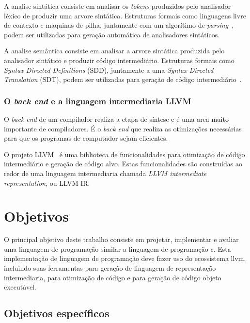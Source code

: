 \documentclass[
  12pt,
  openright,
  twoside,
  a4paper,
  english,
  brazil
]{abntex2}
\begin{document}
A analise sintática consiste em analisar os \textit{tokens} produzidos pelo analisador léxico de produzir uma arvore sintática.
Estruturas formais como linguagens livre de contexto e maquinas de pilha, juntamente com um algorítimo de \textit{parsing}~\cite{knuth1965translation}, podem ser utilizadas para geração automática de analisadores sintáticos.

A analise semântica consiste em analisar a arvore sintática produzida pelo analisador sintático e produzir código intermediário.
Estruturas formais como \textit{Syntax Directed Definitions} (SDD), juntamente a uma \textit{Syntax Directed Translation} (SDT), podem ser utilizadas para geração de código intermediário~\cite{Aho:2006:CPT:1177220}.

\subsection{O \textit{back end} e a linguagem intermediaria LLVM}\label{cap:introducao:sec:o_back_end}

O \textit{back end} de um compilador realiza a etapa de síntese e é uma area muito importante de compiladores.
É o \textit{back end} que realiza as otimizações necessárias para que os programas de computador sejam eficientes.

O projeto LLVM~\cite{lattner2004llvm} é uma biblioteca de funcionalidades para otimização de código intermediário e geração de código alvo.
Estas funcionalidades são construídas ao redor de uma linguagem intermediaria chamada \textit{LLVM intermediate representation}, ou LLVM IR\@.

\chapter{Objetivos}\label{cap:objetivos}

O principal objetivo deste trabalho consiste em projetar, implementar e avaliar uma linguagem de programação similar a linguagem de programação c.
Esta implementação de linguagem de programação deve fazer uso do ecossistema llvm, incluindo suas ferramentas para geração de linguagem de representação intermediaria, para otimização de código e para geração de código objeto executável.

\section{Objetivos específicos}
\end{document}
